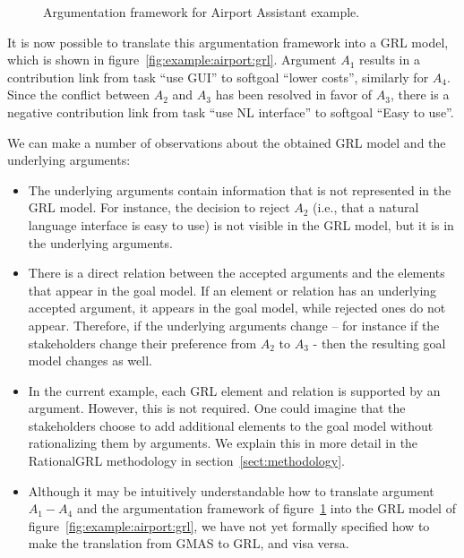 \documentclass[11.5pt,two column]{llncs}
\begin{document}
\begin{figure}
\centering
{}
\caption{Argumentation framework for Airport Assistant example.}
\label{fig:example:airport:arguments}
\end{figure}

It is now possible to translate this argumentation framework into a GRL model, which is shown in figure~\ref{fig:example:airport:grl}. Argument $A_1$ results in a contribution link from task ``use GUI'' to softgoal ``lower costs'', similarly for $A_4$. Since the conflict between $A_2$ and $A_3$ has been resolved in favor of $A_3$, there is a negative contribution link from task ``use NL interface'' to softgoal ``Easy to use''.

We can make a number of observations about the obtained GRL model and the underlying arguments:
\begin{itemize}
\item The underlying arguments contain information that is not represented in the GRL model. For instance, the decision to reject $A_2$ (i.e., that a natural language interface is easy to use) is not visible in the GRL model, but it is in the underlying arguments.
\item There is a direct relation between the accepted arguments and the elements that appear in the goal model. If an element or relation has an underlying accepted argument, it appears in the goal model, while rejected ones do not appear. Therefore, if the underlying arguments change \--- for instance if the stakeholders change their preference from $A_2$ to $A_3$ \-- then the resulting goal model changes as well.
\item In the current example, each GRL element and relation is supported by an argument. However, this is not required. One could imagine that the stakeholders choose to add additional elements to the goal model without rationalizing them by arguments. We explain this in more detail in the RationalGRL methodology in section~\ref{sect:methodology}. 
\item Although it may be intuitively understandable how to translate argument $A_1-A_4$ and the argumentation framework of figure~\ref{fig:example:airport:arguments} into the GRL model of figure~\ref{fig:example:airport:grl}, we have not yet formally specified how to make the translation from GMAS to GRL, and visa versa.
\end{itemize}
\end{document}
